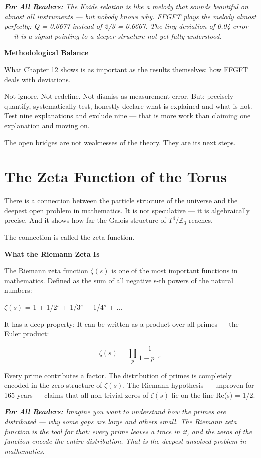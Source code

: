 \documentclass[11pt,oneside]{book}
\newenvironment{laierspur}{%
  \par\vspace{4pt}%
  \noindent\small\itshape\color{blue!60!black}%
  \textbf{For All Readers:}\enspace\ignorespaces}{%
  \par\vspace{4pt}\normalsize\normalfont\normalcolor}
\begin{document}
\begin{laierspur}
The Koide relation is like a melody that sounds beautiful on almost all
instruments — but nobody knows why. FFGFT plays the melody almost perfectly:
Q = 0.6677 instead of 2/3 = 0.6667. The tiny deviation of 0.04%
error — it is a signal pointing to a deeper structure not yet fully understood.
\end{laierspur}

\textbf{Methodological Balance}

What Chapter 12 shows is as important as the results themselves: how FFGFT
deals with deviations.

Not ignore. Not redefine. Not dismiss as measurement error.
But: precisely quantify, systematically test, honestly declare what is
explained and what is not. Test nine explanations and exclude nine — that is
more work than claiming one explanation and moving on.

The open bridges are not weaknesses of the theory. They are its next steps.


\chapter{The Zeta Function of the Torus}

There is a connection between the particle structure of the universe and the
deepest open problem in mathematics. It is not speculative — it is
algebraically precise. And it shows how far the Galois structure of
$T^4/\mathbb{Z}_3$ reaches.

The connection is called the zeta function.

\textbf{What the Riemann Zeta Is}

The Riemann zeta function $\zeta(s)$ is one of the most important functions in
mathematics. Defined as the sum of all negative s-th powers of the natural
numbers:

$\zeta(s)$ = 1 + 1/2$^s$ + 1/3$^s$ + 1/4$^s$ + ...

It has a deep property: It can be written as a product over all primes —
the Euler product:

\[\zeta(s) = \prod_p \frac{1}{1-p^{-s}}\]

Every prime contributes a factor. The distribution of primes is completely
encoded in the zero structure of $\zeta(s)$. The Riemann hypothesis — unproven
for 165 years — claims that all non-trivial zeros of $\zeta(s)$ lie on the line
Re(s) = 1/2.

\begin{laierspur}
Imagine you want to understand how the primes are distributed — why some
gaps are large and others small. The Riemann zeta function is the tool for
that: every prime leaves a trace in it, and the zeros of the function encode
the entire distribution. That is the deepest unsolved problem in mathematics.
\end{laierspur}
\end{document}
